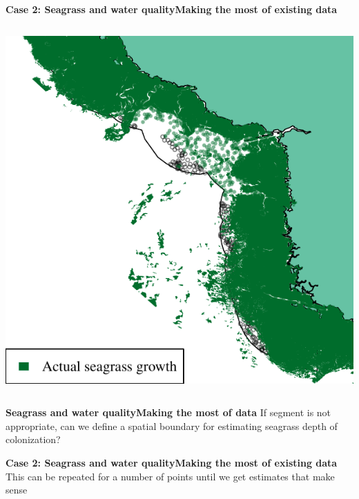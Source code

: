 \documentclass[serif]{beamer}\usepackage[]{graphicx}\usepackage[]{color}
\makeatletter
\def\maxwidth{ %
  \ifdim\Gin@nat@width>\linewidth
    \linewidth
  \else
    \Gin@nat@width
  \fi
}
\newenvironment{knitrout}{}{} %
\makeatother
\begin{document}
\begin{frame}{\textbf{Case 2: Seagrass and water quality}}{\textbf{Making the most of existing data}}
\begin{columns}[T]
\begin{column}{0.45\textwidth}
\begin{knitrout}
{\centering \includegraphics[width=\maxwidth]{fig//docfail2} 

}



\end{knitrout}
\end{column}
\end{columns}
\end{frame}


\begin{frame}{\textbf{Seagrass and water quality}}{\textbf{Making the most of data}}
If segment is not appropriate, can we define a spatial boundary for estimating seagrass depth of colonization?
\begin{center}
\end{center}
\end{frame}


\begin{frame}{\textbf{Case 2: Seagrass and water quality}}{\textbf{Making the most of existing data}}
This can be repeated for a number of points until we get estimates that make sense
\begin{center}
\end{center}
\end{frame}
\end{document}

